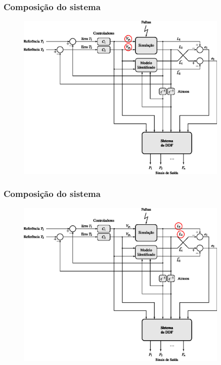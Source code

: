 \documentclass{beamer}
\begin{document}
\begin{frame}
    \frametitle{Composição do sistema}

\begin{figure}[htb]
\centering
    \includegraphics[width=0.9\textwidth]{imgs/sistema/eps/composicao_mod_3}
\end{figure}
\end{frame}

\begin{frame}
    \frametitle{Composição do sistema}

\begin{figure}[htb]
\centering
    \includegraphics[width=0.9\textwidth]{imgs/sistema/eps/composicao_mod_4}
\end{figure}
\end{frame}
\end{document}
